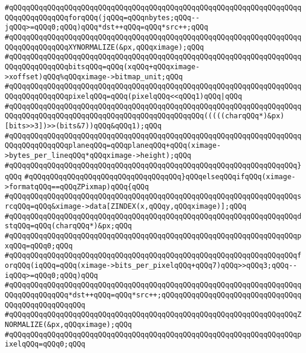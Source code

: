 \verb|#qQQqqQQqqQQqqQQqqQQqqQQqqQQqqQQqqQQqqQQqqQQqqQQqqQQqqQQqqQQqqQQqqQQqqQQqqQQqqQQqqQQqforqQQq(jqQQq=qQQqnbytes;qQQq--jqQQq>=qQQq0;qQQq)qQQq*dst++qQQq=qQQq*src++;qQQq|\newline
\verb|#qQQqqQQqqQQqqQQqqQQqqQQqqQQqqQQqqQQqqQQqqQQqqQQqqQQqqQQqqQQqqQQqqQQqqQQqqQQqqQQqqQQqXYNORMALIZE(&px,qQQqximage);qQQq|\newline
\verb|#qQQqqQQqqQQqqQQqqQQqqQQqqQQqqQQqqQQqqQQqqQQqqQQqqQQqqQQqqQQqqQQqqQQqqQQqqQQqqQQqqQQqbitsqQQq=qQQq(xqQQq+qQQqximage->xoffset)qQQq%qQQqximage->bitmap_unit;qQQq|\newline
\verb|#qQQqqQQqqQQqqQQqqQQqqQQqqQQqqQQqqQQqqQQqqQQqqQQqqQQqqQQqqQQqqQQqqQQqqQQqqQQqqQQqqQQqpixelqQQq=qQQq(pixelqQQq<<qQQq1)qQQq|\verb#|qQQq#\newline
\verb|#qQQqqQQqqQQqqQQqqQQqqQQqqQQqqQQqqQQqqQQqqQQqqQQqqQQqqQQqqQQqqQQqqQQqqQQqqQQqqQQqqQQqqQQqqQQqqQQqqQQqqQQqqQQqqQQqqQQq(((((charqQQq*)&px)[bits>>3])>>(bits&7))qQQq&qQQq1);qQQq|\newline
\verb|#qQQqqQQqqQQqqQQqqQQqqQQqqQQqqQQqqQQqqQQqqQQqqQQqqQQqqQQqqQQqqQQqqQQqqQQqqQQqqQQqqQQqplaneqQQq=qQQqplaneqQQq+qQQq(ximage->bytes_per_lineqQQq*qQQqximage->height);qQQq|\newline
\verb|#qQQqqQQqqQQqqQQqqQQqqQQqqQQqqQQqqQQqqQQqqQQqqQQqqQQqqQQqqQQqqQQqqQQq}qQQq|\newline
\verb|#qQQqqQQqqQQqqQQqqQQqqQQqqQQqqQQqqQQq}qQQqelseqQQqifqQQq(ximage->formatqQQq==qQQqZPixmap)qQQq{qQQq|\newline
\verb|#qQQqqQQqqQQqqQQqqQQqqQQqqQQqqQQqqQQqqQQqqQQqqQQqqQQqqQQqqQQqqQQqqQQqsrcqQQq=qQQq&ximage->data[ZINDEX(x,qQQqy,qQQqximage)];qQQq|\newline
\verb|#qQQqqQQqqQQqqQQqqQQqqQQqqQQqqQQqqQQqqQQqqQQqqQQqqQQqqQQqqQQqqQQqqQQqdstqQQq=qQQq(charqQQq*)&px;qQQq|\newline
\verb|#qQQqqQQqqQQqqQQqqQQqqQQqqQQqqQQqqQQqqQQqqQQqqQQqqQQqqQQqqQQqqQQqqQQqpxqQQq=qQQq0;qQQq|\newline
\verb|#qQQqqQQqqQQqqQQqqQQqqQQqqQQqqQQqqQQqqQQqqQQqqQQqqQQqqQQqqQQqqQQqqQQqforqQQq(iqQQq=qQQq(ximage->bits_per_pixelqQQq+qQQq7)qQQq>>qQQq3;qQQq--iqQQq>=qQQq0;qQQq)qQQq|\newline
\verb|#qQQqqQQqqQQqqQQqqQQqqQQqqQQqqQQqqQQqqQQqqQQqqQQqqQQqqQQqqQQqqQQqqQQqqQQqqQQqqQQqqQQq*dst++qQQq=qQQq*src++;qQQqqQQqqQQqqQQqqQQqqQQqqQQqqQQqqQQqqQQqqQQqqQQqqQQq|\newline
\verb|#qQQqqQQqqQQqqQQqqQQqqQQqqQQqqQQqqQQqqQQqqQQqqQQqqQQqqQQqqQQqqQQqqQQqZNORMALIZE(&px,qQQqximage);qQQq|\newline
\verb|#qQQqqQQqqQQqqQQqqQQqqQQqqQQqqQQqqQQqqQQqqQQqqQQqqQQqqQQqqQQqqQQqqQQqpixelqQQq=qQQq0;qQQq|\newline
